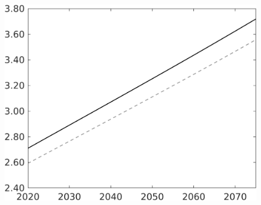 \documentclass[12pt]{article}
\begin{document}
\begin{figure}[h!!]
\begin{minipage}[]{0.32\textwidth}
\end{minipage}		
\begin{minipage}[]{0.32\textwidth}
\includegraphics[width=1\textwidth]{../../codding_model/own_basedOnFried/optimalPol_010922_revision/figures/all_13Sept22/CompTaul_LFBAU_Reg0_wh_spillover0_nsk0_xgr1_knspil1_sep1_countec0_GovRev0_etaa0.79_lgd0.png}
\end{minipage}	
\end{figure}
\end{document}
